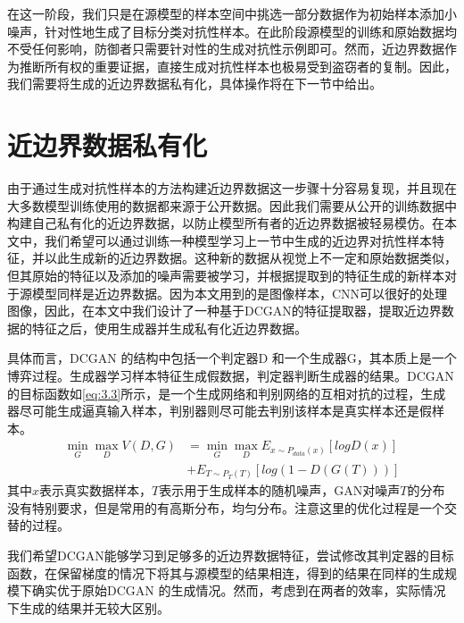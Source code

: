 在这一阶段，我们只是在源模型的样本空间中挑选一部分数据作为初始样本添加小噪声，针对性地生成了目标分类对抗性样本。在此阶段源模型的训练和原始数据均不受任何影响，防御者只需要针对性的生成对抗性示例即可。然而，近边界数据作为推断所有权的重要证据，直接生成对抗性样本也极易受到盗窃者的复制。因此，我们需要将生成的近边界数据私有化，具体操作将在下一节中给出。

\section{近边界数据私有化}\label{3.3}

由于通过生成对抗性样本的方法构建近边界数据这一步骤十分容易复现，并且现在大多数模型训练使用的数据都来源于公开数据。因此我们需要从公开的训练数据中构建自己私有化的近边界数据，以防止模型所有者的近边界数据被轻易模仿。在本文中，我们希望可以通过训练一种模型学习上一节中生成的近边界对抗性样本特征，并以此生成新的近边界数据。这种新的数据从视觉上不一定和原始数据类似，但其原始的特征以及添加的噪声需要被学习，并根据提取到的特征生成的新样本对于源模型同样是近边界数据。因为本文用到的是图像样本，CNN可以很好的处理图像，因此，在本文中我们设计了一种基于DCGAN\cite{radford2015unsupervised}的特征提取器，提取近边界数据的特征之后，使用生成器并生成私有化近边界数据。

具体而言，DCGAN 的结构中包括一个判定器D 和一个生成器G，其本质上是一个博弈过程。生成器学习样本特征生成假数据，判定器判断生成器的结果。DCGAN 的目标函数如\ref{eq:3.3}所示，是一个生成网络和判别网络的互相对抗的过程，生成器尽可能生成逼真输入样本，判别器则尽可能去判别该样本是真实样本还是假样本。
\begin{equation}
	\label{eq:3.9}
	\begin{split}
		\mathop{min} \limits_{G} \mathop{max} \limits_{D} V(D, G) &= \mathop{min} \limits_{G} \mathop{max} \limits_{D} E_{x \sim P_{data}(x)}[logD(x)] \\
		&+ E_{T \sim P_{T}(T)}[log(1 - D(G(T)))]
	\end{split}
\end{equation}
其中$x$表示真实数据样本，$T$表示用于生成样本的随机噪声，GAN对噪声$T$的分布没有特别要求，但是常用的有高斯分布，均匀分布。注意这里的优化过程是一个交替的过程。

我们希望DCGAN能够学习到足够多的近边界数据特征，尝试修改其判定器的目标函数，在保留梯度的情况下将其与源模型的结果相连，得到的结果在同样的生成规模下确实优于原始DCGAN 的生成情况。然而，考虑到在两者的效率，实际情况下生成的结果并无较大区别。

